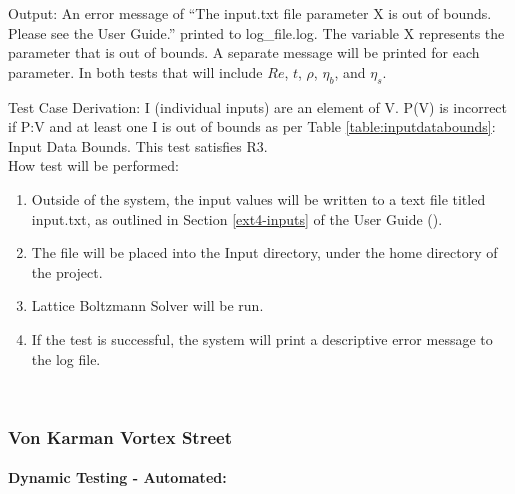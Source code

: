 \documentclass[12pt, titlepage]{article}
\newcommand{\famname}{Lattice Boltzmann Solver}
\begin{document}
\begin{enumerate}
Output: An error message of ``The input.txt file parameter X is out of bounds. Please see the User Guide.'' printed to log\_file.log. The variable X represents the parameter that is out of bounds. A separate message will be printed for each parameter. In both tests that will include $Re$, $t$, $\rho$, $\eta_b$, and $\eta_s$.

Test Case Derivation: 
I (individual inputs) are an element of V. P(V) is incorrect if P:V and at least
one I is out of bounds as per Table \ref{table:inputdatabounds}: Input Data
Bounds. This test satisfies R3.\\
					
How test will be performed: 

\begin{enumerate}
\item Outside of the system, the input values will be written to a text file titled input.txt, as outlined in Section \ref{ext4-inputs} of the User Guide
  (\citet{LBM_UserGuide_PM}).
\item The file will be placed into the Input directory, under the home directory
  of the project.
\item {\famname} will be run.
\item If the test is successful, the system will print a descriptive error message to the log file.\\

\end{enumerate}

\end{enumerate}


~\newpage

\subsubsection{Von Karman Vortex Street}
\label{frvkvs}
		
\paragraph{Dynamic Testing - Automated:}
\end{document}
